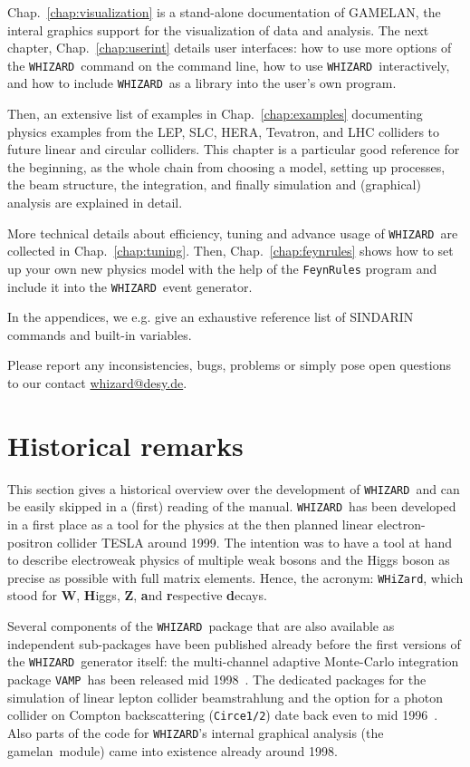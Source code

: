\documentclass[12pt]{book}
\newcommand{\ttt}[1]{\texttt{#1}}
\newcommand{\whizard}{\texttt{WHIZARD}}
\newcommand{\vamp}{\texttt{VAMP}}
\newcommand{\gamelan}{\textsf{gamelan}}
\begin{document}
Chap.~\ref{chap:visualization} is a stand-alone documentation of
GAMELAN, the interal graphics support for the visualization of data
and analysis. The next chapter, Chap.~\ref{chap:userint} details user
interfaces: how to use more options of the \whizard\ command on the
command line, how to use \whizard\ interactively, and how to include
\whizard\ as a library into the user's own program. 

Then, an extensive list of examples in Chap.~\ref{chap:examples}
documenting physics examples from the LEP, SLC, HERA, Tevatron, and
LHC colliders to future linear and circular colliders. This chapter is
a particular good reference for the beginning, as the whole chain from
choosing a model, setting up processes, the beam structure, the
integration, and finally simulation and (graphical) analysis are
explained in detail. 

More technical details about efficiency, tuning and advance usage of
\whizard\ are collected in Chap.~\ref{chap:tuning}. Then,
Chap.~\ref{chap:feynrules} shows how to set up your own new physics
model with the help of the \ttt{FeynRules} program and include it into
the \whizard\ event generator. 

In the appendices, we e.g. give an exhaustive reference list of
SINDARIN commands and built-in variables. 

Please report any inconsistencies, bugs, problems or simply pose open
questions to our contact \url{whizard@desy.de}.



\section{Historical remarks}

This section gives a historical overview over the development of
\whizard\ and can be easily skipped in a (first) reading of the
manual. \whizard\ has been developed in a first place as a tool for
the physics at the then planned linear electron-positron collider
TESLA around 1999. The intention was to have a tool at hand to
describe electroweak physics of multiple weak bosons and the Higgs
boson as precise as possible with full matrix elements. Hence, the
acronym: \ttt{WHiZard}, which stood for $\mathbf{W}$, {\bf H}iggs,
$\mathbf{Z}$, {\bf a}nd {\bf r}espective {\bf d}ecays. 

Several components of the \whizard\ package that are also available as
independent sub-packages have been published already before the first
versions of the \whizard\ generator itself: the multi-channel adaptive
Monte-Carlo integration package \vamp\ has been released mid
1998~\cite{VAMP}. The dedicated packages for the simulation of linear
lepton collider beamstrahlung and the option for a photon collider on
Compton backscattering (\ttt{Circe1/2}) date back even to mid
1996~\cite{CIRCE}. Also parts of the code for \whizard's internal
graphical analysis (the \gamelan\ module) came into existence already
around 1998. 
\end{document}
